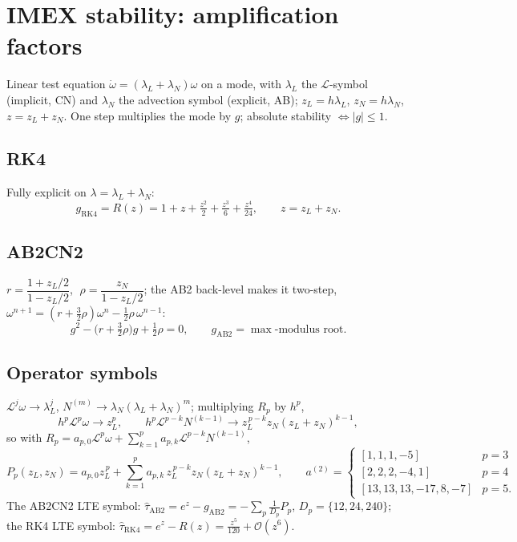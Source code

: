 \documentclass[11pt]{article}
\newcommand{\Lop}{\mathcal{L}}
\newcommand{\bO}{\mathcal{O}}
\newcommand{\zL}{z_L}
\newcommand{\zN}{z_N}
\begin{document}
\section{IMEX stability: amplification factors}

Linear test equation $\dot\omega=(\lambda_L+\lambda_N)\omega$ on a mode, with $\lambda_L$ the
$\Lop$-symbol (implicit, CN) and $\lambda_N$ the advection symbol (explicit, AB);
$\zL=h\lambda_L$, $\zN=h\lambda_N$, $z=\zL+\zN$. One step multiplies the mode by $g$;
absolute stability $\Leftrightarrow|g|\le1$.

\subsection{RK4}
Fully explicit on $\lambda=\lambda_L+\lambda_N$:
\begin{equation}
  g_{\mathrm{RK4}} = R(z) = 1+z+\tfrac{z^2}{2}+\tfrac{z^3}{6}+\tfrac{z^4}{24},
  \qquad z=\zL+\zN.
  \label{eq:g-rk4}
\end{equation}

\subsection{AB2CN2}
$r=\dfrac{1+\zL/2}{1-\zL/2}$, $\;\rho=\dfrac{\zN}{1-\zL/2}$; the AB2 back-level makes it
two-step, $\omega^{n+1}=(r+\tfrac32\rho)\omega^n-\tfrac12\rho\,\omega^{n-1}$:
\begin{equation}
  g^2 - \bigl(r+\tfrac{3}{2}\rho\bigr)g + \tfrac{1}{2}\rho = 0,
  \qquad g_{\mathrm{AB2}} = \max\text{-modulus root}.
  \label{eq:g-ab2}
\end{equation}

\subsection{Operator symbols}
$\Lop^j\omega\to\lambda_L^j$, $N^{(m)}\to\lambda_N(\lambda_L+\lambda_N)^m$; multiplying $R_p$ by $h^p$,
\begin{equation}
  h^p\Lop^p\omega\to\zL^p,\qquad
  h^p\Lop^{p-k}N^{(k-1)}\to \zL^{\,p-k}\zN(\zL+\zN)^{k-1},
\end{equation}
so with $R_p=a_{p,0}\Lop^p\omega+\sum_{k=1}^p a_{p,k}\Lop^{p-k}N^{(k-1)}$,
\begin{equation}
  P_p(\zL,\zN)=a_{p,0}\zL^{\,p}+\sum_{k=1}^{p}a_{p,k}\,\zL^{\,p-k}\zN(\zL+\zN)^{k-1},
  \qquad a^{(2)}=
  \begin{cases} [1,1,1,-5] & p=3\\ [2,2,2,-4,1] & p=4\\ [13,13,13,-17,8,-7] & p=5.\end{cases}
  \label{eq:Pp}
\end{equation}
The AB2CN2 LTE symbol: $\hat\tau_{\mathrm{AB2}}=e^{z}-g_{\mathrm{AB2}}=-\sum_p \tfrac{1}{D_p}P_p$,
$D_p=\{12,24,240\}$; the RK4 LTE symbol: $\hat\tau_{\mathrm{RK4}}=e^z-R(z)=\tfrac{z^5}{120}+\bO(z^6)$.
\end{document}
